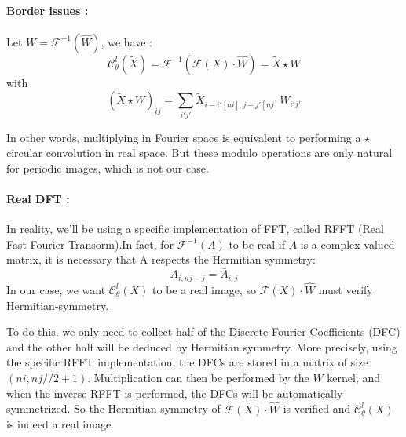 \paragraph{Border issues :}

Let $W=\mathcal{F}^{-1}(\hat{W})$, we have :
\begin{equation*}
	\mathcal{C}_\theta^l(\tilde{X})=\mathcal{F}^{-1}\left(\mathcal{F}(X)\cdot\hat{W}\right)=\tilde{X}\star W
\end{equation*}
with
\begin{equation*}
	(\tilde{X}\star W)_{ij}=\sum_{i'j'}\tilde{X}_{i-i'[ni],j-j'[nj]}W_{i'j'}
\end{equation*}

In other words, multiplying in Fourier space is equivalent to performing a $\star$ circular convolution in real space. But these modulo operations are only natural for periodic images, which is not our case. 

\paragraph{Real DFT :}

In reality, we'll be using a specific implementation of FFT, called RFFT (Real Fast Fourier Transorm).In fact, for $\mathcal{F}^{-1}(A)$ to be real if $A$ is a complex-valued matrix, it is necessary that A respects the Hermitian symmetry:
\begin{equation*}
	A_{i,nj-j} = \bar{A}_{i,j}
\end{equation*}
In our case, we want $\mathcal{C}_\theta^l(X)$ to be a real image, so $\mathcal{F}(X)\cdot\hat{W}$ must verify Hermitian-symmetry.


To do this, we only need to collect half of the Discrete Fourier Coefficients (DFC) and the other half will be deduced by Hermitian symmetry. More precisely, using the specific RFFT implementation, the DFCs are stored in a matrix of size $(ni,nj//2+1)$. Multiplication can then be performed by the $\hat{W}$ kernel, and when the inverse RFFT is performed, the DFCs will be automatically symmetrized. So the Hermitian symmetry of $\mathcal{F}(X)\cdot\hat{W}$ is verified and $\mathcal{C}_\theta^l(X)$ is indeed a real image. 

